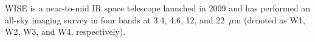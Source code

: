\documentclass[numberedappendix,apj,twocolumn]{emulateapj}
\begin{document}




WISE \citep{Wright2010} is a near-to-mid IR space telescope launched in 2009 and has performed an all-sky imaging survey in four bands at 3.4, 4.6, 12, and 22~$\mu$m (denoted as W1, W2, W3, and W4, respectively).

\end{document}
